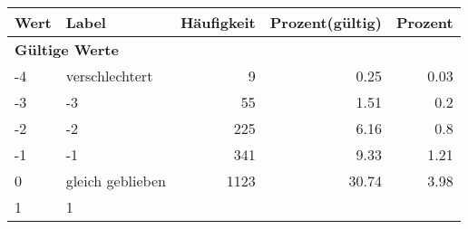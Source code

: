      \begin{longtable}{lXrrr}
     \toprule
     \textbf{Wert} & \textbf{Label} & \textbf{Häufigkeit} & \textbf{Prozent(gültig)} & \textbf{Prozent} \\
     \endhead
     \midrule
     \multicolumn{5}{l}{\textbf{Gültige Werte}}\\

     -4 &
     \multicolumn{1}{X}{ verschlechtert   } &


       \num{9} &
       \num[round-mode=places,round-precision=2]{0.25} &
         \num[round-mode=places,round-precision=2]{0.03} \\

     -3 &
     \multicolumn{1}{X}{ -3   } &


       \num{55} &
       \num[round-mode=places,round-precision=2]{1.51} &
         \num[round-mode=places,round-precision=2]{0.2} \\

     -2 &
     \multicolumn{1}{X}{ -2   } &


       \num{225} &
       \num[round-mode=places,round-precision=2]{6.16} &
         \num[round-mode=places,round-precision=2]{0.8} \\

     -1 &
     \multicolumn{1}{X}{ -1   } &


       \num{341} &
       \num[round-mode=places,round-precision=2]{9.33} &
         \num[round-mode=places,round-precision=2]{1.21} \\

     0 &
     \multicolumn{1}{X}{ gleich geblieben   } &


       \num{1123} &
       \num[round-mode=places,round-precision=2]{30.74} &
         \num[round-mode=places,round-precision=2]{3.98} \\

     1 &
     \multicolumn{1}{X}{ 1   } &



\end{longtable}
